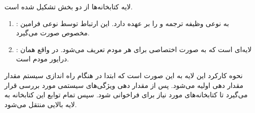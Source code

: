 \SubProblem
{}
{
لایه کتابخانه‌ها از دو بخش تشکیل شده است.
\begin{enumerate}
    \item {}:
    به نوعی وظیفه ترجمه
     و 
    را بر عهده دارد.
    این ارتباط توسط نوعی فرامین مخصوص صورت می‌گیرد.
    \item {}:
    لایه‌ای است که به صورت اختصاصی برای هر مودم تعریف می‌شود. در واقع همان درایور مودم است.
\end{enumerate}

نحوه کارکرد این لایه به این صورت است که ابتدا در هنگام
راه اندازی سیستم مقدار
مقدار دهی اولیه می‌شود.
پس از مقدار دهی ویژگی‌های سیستمی مورد بررسی قرار می‌گیرد تا کتابخانه‌های مورد نیاز برای
فراخوانی شود.
سپس تمام توابع این کتابخانه به لایه بالایی منتقل می‌شود.
}
